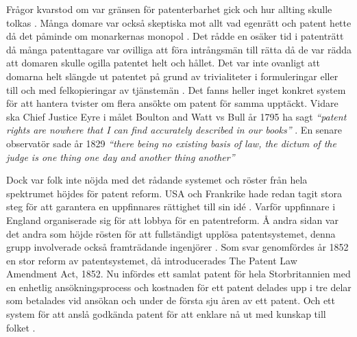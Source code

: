 %
%
%
%


Frågor kvarstod om var gränsen för patenterbarhet gick och hur allting skulle tolkas \cite{bracha}. Många domare var också skeptiska mot allt vad egenrätt och patent hette då det påminde om monarkernas monopol \cite{macleod}.
Det rådde en osäker tid i patenträtt då många patenttagare var ovilliga att föra intrångsmän till
rätta då de var rädda att domaren skulle ogilla patentet helt och hållet. Det var inte ovanligt att
domarna helt slängde ut patentet på grund av trivialiteter i formuleringar eller till och med
felkopieringar av tjänstemän \cite{macleod}. Det fanns heller inget konkret system för att hantera tvister om flera ansökte om patent för samma upptäckt\cite{bracha, webster}. Vidare ska Chief Justice Eyre i målet Boulton and Watt vs Bull år 1795 ha sagt \emph{``patent rights are nowhere that I can find accurately described in our books''} \cite{macleod}. En senare observatör sade år 1829 \emph{``there being no existing basis of law, the dictum of the judge is 
one thing one day and another thing another''} \cite{macleod}



Dock var folk inte nöjda med det rådande systemet och röster från hela spektrumet höjdes för patent reform. USA och Frankrike hade redan tagit stora steg för att garantera en uppfinnares rättighet till sin idé \cite{macleod}. Varför uppfinnare i England organiserade sig för att lobbya för en patentreform\cite{dutton}. Å andra sidan var det andra som höjde rösten för att fullständigt upplösa patentsystemet, denna grupp involverade också framträdande ingenjörer \cite{macleod}.  
Som svar genomfördes år 1852 en stor reform av patentsystemet, då introducerades The Patent Law Amendment Act, 1852. Nu infördes ett samlat patent för hela Storbritannien med en enhetlig ansökningsprocess och kostnaden för ett patent delades upp i tre delar som betalades vid ansökan och under de första sju åren av ett patent. Och ett system för att anslå godkända patent för att enklare nå ut med kunskap till folket \cite{dutton}.

